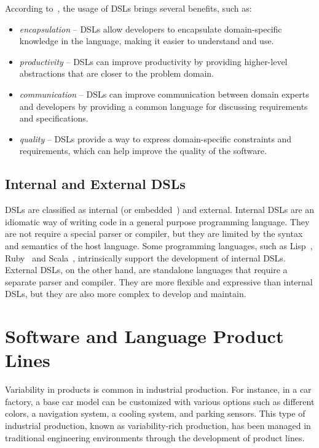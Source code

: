 According to~\cite{Favalli23}, the usage of DSLs brings several benefits, such as:
\begin{itemize}
    \item \textit{encapsulation} -- DSLs allow developers to encapsulate domain-specific knowledge in the language, making it easier to understand and use.
    \item \textit{productivity} -- DSLs can improve productivity by providing higher-level abstractions that are closer to the problem domain.
    \item \textit{communication} -- DSLs can improve communication between domain experts and developers by providing a common language for discussing requirements and specifications.
    \item \textit{quality} -- DSLs provide a way to express domain-specific constraints and requirements, which can help improve the quality of the software.
\end{itemize}

\subsection{Internal and External DSLs}\label{subsec:background:InternalAndExternalDSLs}

DSLs are classified as internal (or embedded~\cite{Fowler10}) and external. Internal DSLs are an idiomatic way of writing code in a general purpose programming language. They are not require a special parser or compiler, but they are limited by the syntax and semantics of the host language.
Some programming languages, such as Lisp~\cite{Fowler05}, Ruby~\cite{Fowler10} and Scala~\cite{Artho15}, intrinsically support the development of internal DSLs.
External DSLs, on the other hand, are standalone languages that require a separate parser and compiler. They are more flexible and expressive than internal DSLs, but they are also more complex to develop and maintain.



\section{Software and Language Product Lines}\label{sec:background:SoftwareAndLanguageProductLines}

Variability in products is common in industrial production. For instance, in a car factory, a base car model can be customized with various options such as different colors, a navigation system, a cooling system, and parking sensors. This type of industrial production, known as variability-rich production, has been managed in traditional engineering environments through the development of product lines.


